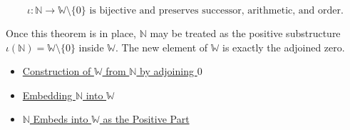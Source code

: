 \begin{remark*}
\[
\iota:\mathbb{N}\to \mathbb{W}\setminus\{0\} \text{ is bijective and preserves successor, arithmetic, and order.}
\]
\end{remark*}
\begin{remark*}[Interpretation]
Once this theorem is in place, $\mathbb{N}$ may be treated as the positive
substructure $\iota(\mathbb{N})=\mathbb{W}\setminus\{0\}$ inside
$\mathbb{W}$. The new element of $\mathbb{W}$ is exactly the adjoined zero.
\end{remark*}
\begin{dependencies}
\begin{itemize}
  \item \hyperref[def:whole-numbers]{Construction of $\mathbb{W}$ from $\mathbb{N}$ by adjoining $0$}
  \item \hyperref[def:embedding-n-into-w]{Embedding $\mathbb{N}$ into $\mathbb{W}$}
  \item \hyperref[thm:n-embeds-into-w-as-positive-part]{$\mathbb{N}$ Embeds into $\mathbb{W}$ as the Positive Part}
\end{itemize}
\end{dependencies}
